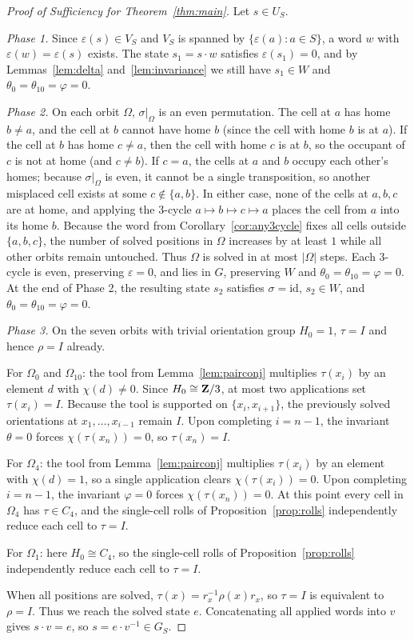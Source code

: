 \documentclass[a4paper,11pt]{article}
\begin{document}
\begin{proof}[Proof of Sufficiency for Theorem~\ref{thm:main}]
Let $s\in U_S$.

\emph{Phase 1.} Since $\varepsilon(s)\in V_S$ and $V_S$ is spanned by $\{\varepsilon(a):a\in S\}$, a word $w$ with $\varepsilon(w)=\varepsilon(s)$ exists.
The state $s_1=s\cdot w$ satisfies $\varepsilon(s_1)=0$, and by Lemmas~\ref{lem:delta} and~\ref{lem:invariance} we still have $s_1\in W$ and $\theta_0=\theta_{10}=\varphi=0$.

\emph{Phase 2.} On each orbit $\Omega$, $\sigma|_\Omega$ is an even permutation.
The cell at $a$ has home $b\ne a$, and the cell at $b$ cannot have home $b$ (since the cell with home $b$ is at $a$).
If the cell at $b$ has home $c\ne a$, then the cell with home $c$ is at $b$, so the occupant of $c$ is not at home (and $c\ne b$).
If $c=a$, the cells at $a$ and $b$ occupy each other's homes; because $\sigma|_\Omega$ is even, it cannot be a single transposition, so another misplaced cell exists at some $c\notin\{a,b\}$.
In either case, none of the cells at $a,b,c$ are at home, and applying the 3-cycle $a\mapsto b\mapsto c\mapsto a$ places the cell from $a$ into its home $b$.
Because the word from Corollary~\ref{cor:any3cycle} fixes all cells outside $\{a,b,c\}$, the number of solved positions in $\Omega$ increases by at least $1$ while all other orbits remain untouched.
Thus $\Omega$ is solved in at most $|\Omega|$ steps.
Each 3-cycle is even, preserving $\varepsilon=0$, and lies in $G$, preserving $W$ and $\theta_0=\theta_{10}=\varphi=0$.
At the end of Phase 2, the resulting state $s_2$ satisfies $\sigma=\mathrm{id}$, $s_2\in W$, and $\theta_0=\theta_{10}=\varphi=0$.

\emph{Phase 3.} On the seven orbits with trivial orientation group $H_0=1$, $\tau=I$ and hence $\rho=I$ already.

For $\Omega_0$ and $\Omega_{10}$: the tool from Lemma~\ref{lem:pairconj} multiplies $\tau(x_i)$ by an element $d$ with $\chi(d)\ne0$.
Since $H_0\cong\mathbf{Z}/3$, at most two applications set $\tau(x_i)=I$. Because the tool is supported on $\{x_i,x_{i+1}\}$, the previously solved orientations at $x_1,\dots,x_{i-1}$ remain $I$.
Upon completing $i=n-1$, the invariant $\theta=0$ forces $\chi(\tau(x_n))=0$, so $\tau(x_n)=I$.

For $\Omega_4$: the tool from Lemma~\ref{lem:pairconj} multiplies $\tau(x_i)$ by an element with $\chi(d)=1$, so a single application clears $\chi(\tau(x_i))=0$.
Upon completing $i=n-1$, the invariant $\varphi=0$ forces $\chi(\tau(x_n))=0$.
At this point every cell in $\Omega_4$ has $\tau\in C_4$, and the single-cell rolls of Proposition~\ref{prop:rolls} independently reduce each cell to $\tau=I$.

For $\Omega_1$: here $H_0\cong C_4$, so the single-cell rolls of Proposition~\ref{prop:rolls} independently reduce each cell to $\tau=I$.

When all positions are solved, $\tau(x)=r_x^{-1}\rho(x)r_x$, so $\tau=I$ is equivalent to $\rho=I$.
Thus we reach the solved state $e$. Concatenating all applied words into $v$ gives $s\cdot v=e$, so $s=e\cdot v^{-1}\in G_S$.
\end{proof}
\end{document}
